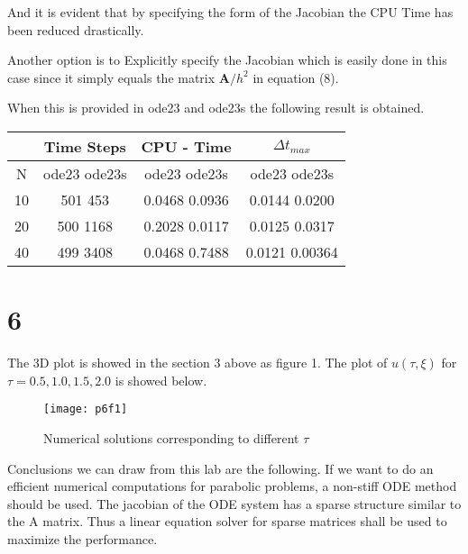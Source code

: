 \documentclass[11pt,a4paper,roman]{scrartcl}
\begin{document}
And it is evident that by specifying the form of the Jacobian the CPU Time has been reduced drastically.




Another option is to Explicitly specify the Jacobian which is easily done in this case since it simply equals the matrix $\textbf{A}/h^2$ in equation (8).

When this is provided in ode23 and ode23s the following result is obtained.

\begin{table}[h]
\begin{center}
\begin{tabular}{ | c | c | c |c|}
\hline
   & Time Steps    & CPU - Time      & $\Delta t_{max}$  \\ \hline
N  &  ode23 ode23s &  ode23   ode23s &   ode23 ode23s  \\ \hline
10 &   501   453   &  0.0468  0.0936 &  0.0144  0.0200 \\ \hline 20 &   500   1168   &  0.2028  0.0117 &  0.0125  0.0317 \\ \hline
40 &   499   3408   &  0.0468 0.7488 &  0.0121  0.00364 \\ \hline
\end{tabular}
\end{center}
\label{Statistics for comparison between ode23 and ode23s}
\end{table}












































\section*{6}
The 3D plot is showed in the section 3 above as figure 1. The plot of $u(\tau,\xi)$ for $\tau = 0.5, 1.0, 1.5, 2.0$ is showed below. 

\begin{figure}[h]
\centering
\texttt{[image: p6f1]}
\caption{Numerical solutions corresponding to different $\tau$}
\end{figure}

Conclusions we can draw from this lab are the following. 
If we want to do an efficient numerical computations for parabolic problems, a non-stiff ODE method should be used. The jacobian of the ODE system has a sparse structure similar to the A matrix. Thus a linear equation solver for sparse matrices shall be used to maximize the performance. 
\end{document}
